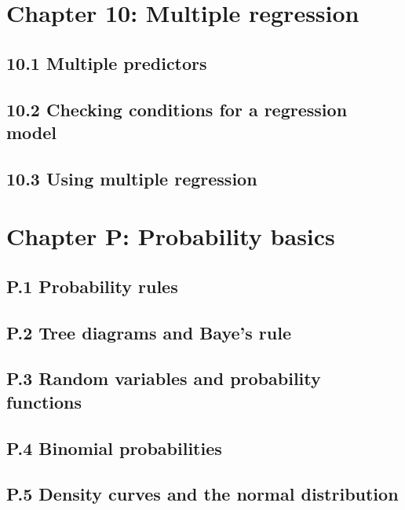 \documentclass{article}
\begin{document}
\section{Chapter 10: Multiple regression}
\subsection{10.1 Multiple predictors}
\subsection{10.2 Checking conditions for a regression model}
\subsection{10.3 Using multiple regression}


\section{Chapter P: Probability basics}
\subsection{P.1 Probability rules}
\subsection{P.2 Tree diagrams and Baye's rule}
\subsection{P.3 Random variables and probability functions}
\subsection{P.4 Binomial probabilities}
\subsection{P.5 Density curves and the normal distribution}
\end{document}
